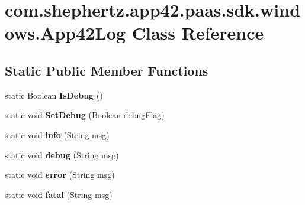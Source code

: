 \hypertarget{classcom_1_1shephertz_1_1app42_1_1paas_1_1sdk_1_1windows_1_1_app42_log}{\section{com.\+shephertz.\+app42.\+paas.\+sdk.\+windows.\+App42\+Log Class Reference}
\label{classcom_1_1shephertz_1_1app42_1_1paas_1_1sdk_1_1windows_1_1_app42_log}
}
\subsection*{Static Public Member Functions}
\begin{DoxyCompactItemize}
\item 
\hypertarget{classcom_1_1shephertz_1_1app42_1_1paas_1_1sdk_1_1windows_1_1_app42_log_a092a4e022c3fe6f09372b1ccf80c996a}{static Boolean {\bfseries Is\+Debug} ()}\label{classcom_1_1shephertz_1_1app42_1_1paas_1_1sdk_1_1windows_1_1_app42_log_a092a4e022c3fe6f09372b1ccf80c996a}

\item 
\hypertarget{classcom_1_1shephertz_1_1app42_1_1paas_1_1sdk_1_1windows_1_1_app42_log_a0e3cb9128bd26925294d1b8c46d2a8fb}{static void {\bfseries Set\+Debug} (Boolean debug\+Flag)}\label{classcom_1_1shephertz_1_1app42_1_1paas_1_1sdk_1_1windows_1_1_app42_log_a0e3cb9128bd26925294d1b8c46d2a8fb}

\item 
\hypertarget{classcom_1_1shephertz_1_1app42_1_1paas_1_1sdk_1_1windows_1_1_app42_log_a46b4e13136123e57815ea8ae903adba0}{static void {\bfseries info} (String msg)}\label{classcom_1_1shephertz_1_1app42_1_1paas_1_1sdk_1_1windows_1_1_app42_log_a46b4e13136123e57815ea8ae903adba0}

\item 
\hypertarget{classcom_1_1shephertz_1_1app42_1_1paas_1_1sdk_1_1windows_1_1_app42_log_ab70ce701e37bf16e89e0cf447db264e5}{static void {\bfseries debug} (String msg)}\label{classcom_1_1shephertz_1_1app42_1_1paas_1_1sdk_1_1windows_1_1_app42_log_ab70ce701e37bf16e89e0cf447db264e5}

\item 
\hypertarget{classcom_1_1shephertz_1_1app42_1_1paas_1_1sdk_1_1windows_1_1_app42_log_af047ee994380590cff25ef258aca11f7}{static void {\bfseries error} (String msg)}\label{classcom_1_1shephertz_1_1app42_1_1paas_1_1sdk_1_1windows_1_1_app42_log_af047ee994380590cff25ef258aca11f7}

\item 
\hypertarget{classcom_1_1shephertz_1_1app42_1_1paas_1_1sdk_1_1windows_1_1_app42_log_abf0a5195d5d0a9b0e31605618d6c8e82}{static void {\bfseries fatal} (String msg)}\label{classcom_1_1shephertz_1_1app42_1_1paas_1_1sdk_1_1windows_1_1_app42_log_abf0a5195d5d0a9b0e31605618d6c8e82}

\end{DoxyCompactItemize}
